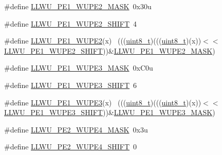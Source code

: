 \begin{DoxyCompactItemize}
\item 
\#define \hyperlink{group___l_l_w_u___register___masks_ga97e8e2fc8ce673f6b4625d307bc94b4a}{L\+L\+W\+U\+\_\+\+P\+E1\+\_\+\+W\+U\+P\+E2\+\_\+\+M\+A\+SK}~0x30u
\item 
\#define \hyperlink{group___l_l_w_u___register___masks_ga0b1bb86eb31a82a18ad1491b0305000b}{L\+L\+W\+U\+\_\+\+P\+E1\+\_\+\+W\+U\+P\+E2\+\_\+\+S\+H\+I\+FT}~4
\item 
\#define \hyperlink{group___l_l_w_u___register___masks_gaf0bb98cad9b61c52ec222ab4443f6999}{L\+L\+W\+U\+\_\+\+P\+E1\+\_\+\+W\+U\+P\+E2}(x)                                            ~(((\hyperlink{_p_e___types_8h_aba7bc1797add20fe3efdf37ced1182c5}{uint8\+\_\+t})(((\hyperlink{_p_e___types_8h_aba7bc1797add20fe3efdf37ced1182c5}{uint8\+\_\+t})(x))$<$$<$\hyperlink{group___l_l_w_u___register___masks_ga0b1bb86eb31a82a18ad1491b0305000b}{L\+L\+W\+U\+\_\+\+P\+E1\+\_\+\+W\+U\+P\+E2\+\_\+\+S\+H\+I\+FT}))\&\hyperlink{group___l_l_w_u___register___masks_ga97e8e2fc8ce673f6b4625d307bc94b4a}{L\+L\+W\+U\+\_\+\+P\+E1\+\_\+\+W\+U\+P\+E2\+\_\+\+M\+A\+SK})
\item 
\#define \hyperlink{group___l_l_w_u___register___masks_ga44cae929b3178e210eb5e1346a4ce997}{L\+L\+W\+U\+\_\+\+P\+E1\+\_\+\+W\+U\+P\+E3\+\_\+\+M\+A\+SK}~0x\+C0u
\item 
\#define \hyperlink{group___l_l_w_u___register___masks_gaceee1b1b6323ba4d33abf875718e885a}{L\+L\+W\+U\+\_\+\+P\+E1\+\_\+\+W\+U\+P\+E3\+\_\+\+S\+H\+I\+FT}~6
\item 
\#define \hyperlink{group___l_l_w_u___register___masks_gaa17ad889c6732bb2f6352d4e5877058c}{L\+L\+W\+U\+\_\+\+P\+E1\+\_\+\+W\+U\+P\+E3}(x)                                            ~(((\hyperlink{_p_e___types_8h_aba7bc1797add20fe3efdf37ced1182c5}{uint8\+\_\+t})(((\hyperlink{_p_e___types_8h_aba7bc1797add20fe3efdf37ced1182c5}{uint8\+\_\+t})(x))$<$$<$\hyperlink{group___l_l_w_u___register___masks_gaceee1b1b6323ba4d33abf875718e885a}{L\+L\+W\+U\+\_\+\+P\+E1\+\_\+\+W\+U\+P\+E3\+\_\+\+S\+H\+I\+FT}))\&\hyperlink{group___l_l_w_u___register___masks_ga44cae929b3178e210eb5e1346a4ce997}{L\+L\+W\+U\+\_\+\+P\+E1\+\_\+\+W\+U\+P\+E3\+\_\+\+M\+A\+SK})
\item 
\#define \hyperlink{group___l_l_w_u___register___masks_ga94128d26c60f13d22acf47200f4f37e0}{L\+L\+W\+U\+\_\+\+P\+E2\+\_\+\+W\+U\+P\+E4\+\_\+\+M\+A\+SK}~0x3u
\item 
\#define \hyperlink{group___l_l_w_u___register___masks_ga12aa6ffb998e5273a8dd548ac434ad41}{L\+L\+W\+U\+\_\+\+P\+E2\+\_\+\+W\+U\+P\+E4\+\_\+\+S\+H\+I\+FT}~0
\item 

\end{DoxyCompactItemize}
